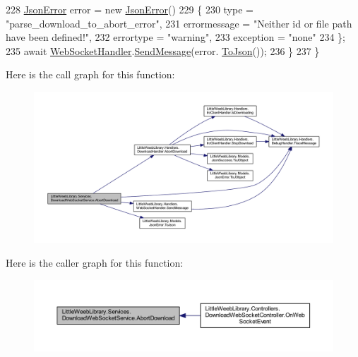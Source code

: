 \begin{DoxyCode}
228                 \mbox{\hyperlink{class_little_weeb_library_1_1_models_1_1_json_error}{JsonError}} error = \textcolor{keyword}{new} \mbox{\hyperlink{class_little_weeb_library_1_1_models_1_1_json_error}{JsonError}}()
229                 \{
230                     type = \textcolor{stringliteral}{"parse\_download\_to\_abort\_error"},
231                     errormessage = \textcolor{stringliteral}{"Neither id or file path have been defined!"},
232                     errortype = \textcolor{stringliteral}{"warning"},
233                     exception = \textcolor{stringliteral}{"none"}
234                 \};
235                 await \mbox{\hyperlink{class_little_weeb_library_1_1_handlers_1_1_web_socket_handler}{WebSocketHandler}}.\mbox{\hyperlink{class_little_weeb_library_1_1_handlers_1_1_web_socket_handler_a1de289d54d665a32c93478c68d3e6ad0}{SendMessage}}(error.
      \mbox{\hyperlink{class_little_weeb_library_1_1_models_1_1_json_error_a0e3e7dd2e2990404b7f0461742b23440}{ToJson}}());
236             \}
237         \}
\end{DoxyCode}
Here is the call graph for this function\+:\nopagebreak
\begin{figure}[H]
\begin{center}
\leavevmode
\includegraphics[width=350pt]{class_little_weeb_library_1_1_services_1_1_download_web_socket_service_a0ab2f2e6fcb90cd42dfa0de9d6a58f7e_cgraph}
\end{center}
\end{figure}
Here is the caller graph for this function\+:\nopagebreak
\begin{figure}[H]
\begin{center}
\leavevmode
\includegraphics[width=350pt]{class_little_weeb_library_1_1_services_1_1_download_web_socket_service_a0ab2f2e6fcb90cd42dfa0de9d6a58f7e_icgraph}
\end{center}
\end{figure}

